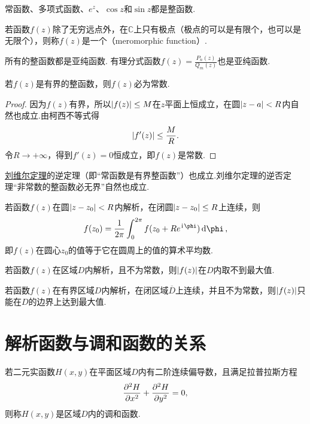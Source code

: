 \begin{example}
常函数、多项式函数、\(e^z\)、\(\cos z\)和\(\sin z\)都是整函数.
\end{example}

\begin{definition}
若函数\(f(z)\)除了无穷远点外，在\(\mathbb{C}\)上只有极点（极点的可以是有限个，也可以是无限个），则称\(f(z)\)是一个（meromorphic function）.
\end{definition}

\begin{example}
所有的整函数都是亚纯函数.
有理分式函数\(f(z) = \frac{P_n(z)}{Q_m(z)}\)也是亚纯函数.
\end{example}

\begin{theorem}[刘维尔定理]\label{theorem:解析函数的积分表示.刘维尔定理}
若\(f(z)\)是有界的整函数，则\(f(z)\)必为常数.
\begin{proof}
因为\(f(z)\)有界，所以\(\abs{f(z)} \leq M\)在\(z\)平面上恒成立，在圆\(\abs{z-a}<R\)内自然也成立.由柯西不等式得\[
\abs{f'(z)} \leq \frac{M}{R}.
\]令\(R\to+\infty\)，得到\(f'(z)=0\)恒成立，即\(f(z)\)是常数.
\end{proof}
\end{theorem}
\hyperref[theorem:解析函数的积分表示.刘维尔定理]{刘维尔定理}的逆定理（即“常函数是有界整函数”）也成立.刘维尔定理的逆否定理“非常数的整函数必无界”自然也成立.

\begin{theorem}[解析函数的平均值定理]\label{theorem:解析函数的积分表示.平均值定理}
若函数\(f(z)\)在圆\(\abs{z-z_0}<R\)内解析，在闭圆\(\abs{z-z_0} \leq R\)上连续，则\[
f(z_0) = \frac{1}{2\pi} \int_0^{2\pi} f(z_0+Re^{\iu\phi}) \dd{\phi},
\]即\(f(z)\)在圆心\(z_0\)的值等于它在圆周上的值的算术平均数.
\end{theorem}

\begin{theorem}[最大模定理]\label{theorem:解析函数的积分表示.最大模定理}
若函数\(f(z)\)在区域\(D\)内解析，且不为常数，则\(\abs{f(z)}\)在\(D\)内取不到最大值.
\end{theorem}

\begin{corollary}\label{theorem:解析函数的积分表示.最大模定理推论}
若函数\(f(z)\)在有界区域\(D\)内解析，在闭区域\(\overline{D}\)上连续，并且不为常数，则\(\abs{f(z)}\)只能在\(D\)的边界上达到最大值.
\end{corollary}

\section{解析函数与调和函数的关系}
\begin{definition}
若二元实函数\(H(x,y)\)在平面区域\(D\)内有二阶连续偏导数，且满足拉普拉斯方程\[
\pdv[2]{H}{x} + \pdv[2]{H}{y} = 0,
\]则称\(H(x,y)\)是区域\(D\)内的调和函数.
\end{definition}

